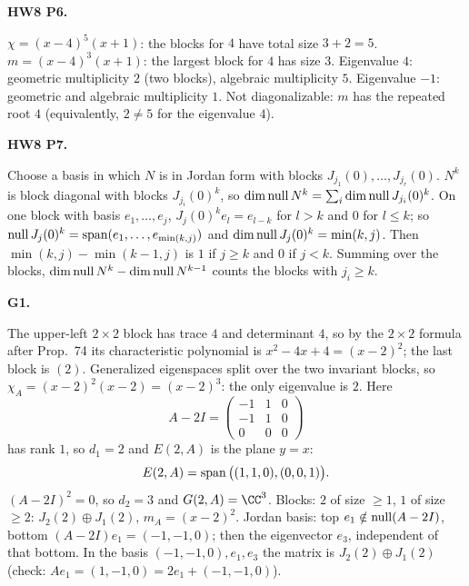 \documentclass[10pt]{scrartcl}
\begin{document}
\begin{prob}
\textbf{HW8 P6. }\par 
\begin{enumerate}[(a)]
  \ii $\chi=(x-4)^5(x+1)$: the blocks for $4$ have total size $3+2=5$.
  \ii $m=(x-4)^3(x+1)$: the largest block for $4$ has size $3$.
  \ii Eigenvalue $4$: geometric multiplicity $2$ (two blocks), algebraic multiplicity $5$. Eigenvalue $-1$: geometric and algebraic multiplicity $1$.
  \ii Not diagonalizable: $m$ has the repeated root $4$ (equivalently, $2\ne5$ for the eigenvalue $4$).
\end{enumerate}
\end{prob}

\begin{prob}
\textbf{HW8 P7. }\par 
{}Choose a basis in which $N$ is in Jordan form with blocks $J_{j_1}(0),\dots,J_{j_r}(0)$. $N^k$ is block diagonal with blocks $J_{j_i}(0)^k$, so $\dim\operatorname{null} N^k=\sum_i\dim\operatorname{null} J_{j_i}(0)^k$. On one block with basis $e_1,\dots,e_j$, $J_j(0)^ke_l=e_{l-k}$ for $l>k$ and $0$ for $l\le k$; so $\operatorname{null} J_j(0)^k=\operatorname{span}(e_1,\dots,e_{\min(k,j)})$ and $\dim\operatorname{null} J_j(0)^k=\min(k,j)$. Then $\min(k,j)-\min(k-1,j)$ is $1$ if $j\ge k$ and $0$ if $j<k$. Summing over the blocks, $\dim\operatorname{null} N^k-\dim\operatorname{null} N^{k-1}$ counts the blocks with $j_i\ge k$.
\end{prob}

\begin{prob}
\textbf{G1. }\par 
{}
The upper-left $2\times2$ block has trace $4$ and determinant $4$, so by the $2\times2$ formula after Prop.~74 its characteristic polynomial is $x^2-4x+4=(x-2)^2$; the last block is $(2)$. Generalized eigenspaces split over the two invariant blocks, so $\chi_A=(x-2)^2(x-2)=(x-2)^3$: the only eigenvalue is $2$. Here
\[
  A-2I=\begin{pmatrix}-1&1&0\\-1&1&0\\0&0&0\end{pmatrix}
\]
has rank $1$, so $d_1=2$ and $E(2,A)$ is the plane $y=x$:
\[ E(2,A)=\operatorname{span}\big((1,1,0),(0,0,1)\big). \] $(A-2I)^2=0$, so $d_2=3$ and $G(2,A)=\CC^3$. Blocks: $2$ of size $\ge1$, $1$ of size $\ge2$: $J_2(2)\oplus J_1(2)$, $m_A=(x-2)^2$. Jordan basis: top $e_1\notin\operatorname{null}(A-2I)$, bottom $(A-2I)e_1=(-1,-1,0)$; then the eigenvector $e_3$, independent of that bottom. In the basis $(-1,-1,0),e_1,e_3$ the matrix is $J_2(2)\oplus J_1(2)$ (check: $Ae_1=(1,-1,0)=2e_1+(-1,-1,0)$).
\end{prob}
\end{document}
